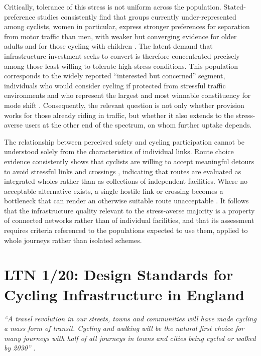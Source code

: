 Critically, tolerance of this stress is not uniform across the population. Stated-preference studies consistently find that groups currently under-represented among cyclists, women in particular, express stronger preferences for separation from motor traffic than men, with weaker but converging evidence for older adults and for those cycling with children \parencite{aldred2017}. The latent demand that infrastructure investment seeks to convert is therefore concentrated precisely among those least willing to tolerate high-stress conditions. This population corresponds to the widely reported “interested but concerned” segment, individuals who would consider cycling if protected from stressful traffic environments and who represent the largest and most winnable constituency for mode shift \parencite{geller2009,mekuria2012a,dill2013}. Consequently, the relevant question is not only whether provision works for those already riding in traffic, but whether it also extends to the stress-averse users at the other end of the spectrum, on whom further uptake depends.

The relationship between perceived safety and cycling participation cannot be understood solely from the characteristics of individual links. Route choice evidence consistently shows that cyclists are willing to accept meaningful detours to avoid stressful links and crossings \parencite{broach2012,park2019,berghoefer2023}, indicating that routes are evaluated as integrated wholes rather than as collections of independent facilities. Where no acceptable alternative exists, a single hostile link or crossing becomes a bottleneck that can render an otherwise suitable route unacceptable \parencite{mekuria2012a,furth2016,furth2018}. It follows that the infrastructure quality relevant to the stress-averse majority is a property of connected networks rather than of individual facilities, and that its assessment requires criteria referenced to the populations expected to use them, applied to whole journeys rather than isolated schemes.



\section{LTN 1/20: Design Standards for Cycling Infrastructure in England}
\label{sec:lit-ltn}

\textit{``A travel revolution in our streets, towns and communities will have made cycling a mass form of transit. Cycling and walking will be the natural first choice for many journeys with half of all journeys in towns and cities being cycled or walked by 2030''}
\parencite{departmentfortransport2020}.

